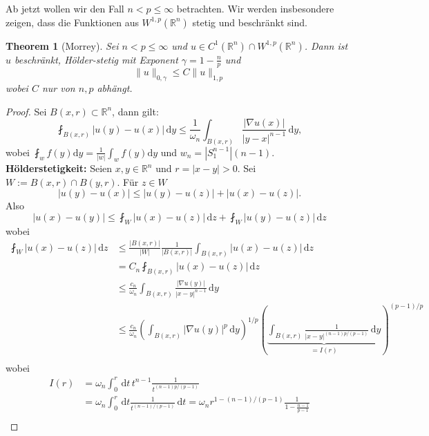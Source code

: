\documentclass[
paper=a4,
bibtotocnumbered,
liststotocnumbered,
tablecaptionabove,
pointlessnumbers,
twoside,
openright,
10pt
]
{report}
\newtheorem{thm}{Theorem}[chapter]
\theoremstyle{definition}
\numberwithin{equation}{chapter}
\begin{document}
Ab jetzt wollen wir den Fall $n <p \leq \infty$ betrachten. Wir werden insbesondere zeigen, dass die Funktionen aus $W^{1,p}(\mathbb{R}^n)$ stetig und beschränkt sind.
\begin{thm}[Morrey]\label{3.4}
Sei $n<p\le \infty$ und $u\in C^1(\mathbb R^n)\cap W^{1,p}(\mathbb R^n)$. Dann ist $u$ beschränkt, Hölder-stetig mit Exponent $\gamma =1 - \frac{n}{p}$ und
	\begin{equation}
		\| u\|_{0, \gamma} \le C \| u \|_{1,p}
	\end{equation}
	wobei $C$ nur von $n,p$ abhängt.
\end{thm}
\begin{proof}
	Sei $B(x,r) \subset \mathbb R^n$, dann gilt:
	\begin{equation}
		\fint_{B(x,r)} | u(y)- u(x) |\, \mathrm dy \le \frac{1}{\omega_n} \int_{B(x,r)} \frac{|\nabla u(x)|}{|y-x|^{n-1}}\, \mathrm dy,
	\end{equation}
	wobei $\fint_w f(y) \mathrm{d}y = \frac{1}{|w|} \int_w f(y) \mathrm{d}y$ und $w_n = \left| S_1^{n-1} \right|(n-1)$.
	\\
	\textbf{Hölderstetigkeit:} Seien $x,y\in \mathbb R^n$ und $r=|x-y|>0$. Sei $W:= B(x,r) \cap B(y,r)$. Für $z\in W$
	\begin{equation}
	|u(y)-u(x)|\le |u(y)-u(z)|+ |u(x)-u(z)|.
	\end{equation}
	Also
	\begin{equation}
		|u(x)-u(y)| \le \fint_W | u(x) - u(z)| \, \mathrm dz + \fint_W |u(y)-u(z)|\, \mathrm dz
	\end{equation}
	wobei 
	\begin{align*}
	\fint_W |u(x)-u(z)|\, \mathrm dz &\le \frac{|B(x,r)|}{|W|} \frac{1}{|B(x,r)|} \int_{B(x,r)} |u(x)- u(z)|\, \mathrm dz\\
	&= C_n \fint_{B(x,r)} |u(x)-u(z)|\, \mathrm dz \\
	&\le \frac{c_n}{\omega_n} \int_{B(x,r)} \frac{|\nabla u(y)|}{|x-y|^{n-1}} \, \mathrm dy \\
	&\le \frac{c_n}{\omega_n} \left ( \int_{B(x,r)} |\nabla u(y)|^p \, \mathrm dy \right )^{1/p} \left ( \underbrace{\int_{B(x,r)} \frac{1}{|x-y|^{(n-1) p/(p-1)}}\, \mathrm dy}_{=I(r)} \right )^{(p-1)/p}\\
\end{align*}
wobei
\begin{align*}
	I(r) &= \omega_n \int_0^r \, \mathrm dt \, t^{n-1} \frac{1}{t^{(n-1) p/(p-1)}} \\
	&= \omega_n \int_0^r \, \mathrm dt \frac{1}{t^{(n-1)/(p-1)}}\, \mathrm dt = \omega_n r^{1-(n-1)/(p-1)} \frac{1}{1-\frac{n-1}{p-1}} \\

\end{align*}
\end{proof}
\end{document}
